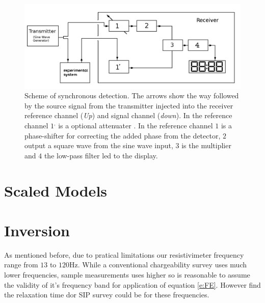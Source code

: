 \documentclass{vie16}
\begin{document}
\begin{figure}[h!]
	\centering
	\includegraphics[keepaspectratio=true,scale=0.3]{Sistema-Inside_Lock_In}
	\caption{Scheme of synchronous detection. The arrows show the way followed by the source signal from the transmitter injected into the receiver reference channel (\textit{Up}) and signal channel (\textit{down}). In the reference channel $1^{,}$ is a optional attenuater%
	 . In the reference channel $1$ is a phase-shifter for correcting the added phase from the detector, $2$ output a square wave from the sine wave input, $3$ is the multiplier and  $4$ the low-pass filter led to the display. }
	\label{f:Lock-in}
\end{figure}





\section{Scaled Models}


\section{Inversion}

As mentioned before, due to pratical limitations our resistivimeter frequency range from $13$ to $120$Hz.
While a conventional chargeability survey uses much lower frequencies, sample measurements uses higher %
so is reasonable to assume the validity of it's frequency band for application of equation \ref{e:FE}. However
find the relaxation time dor SIP survey could be %
for these frequencies.
\end{document}
